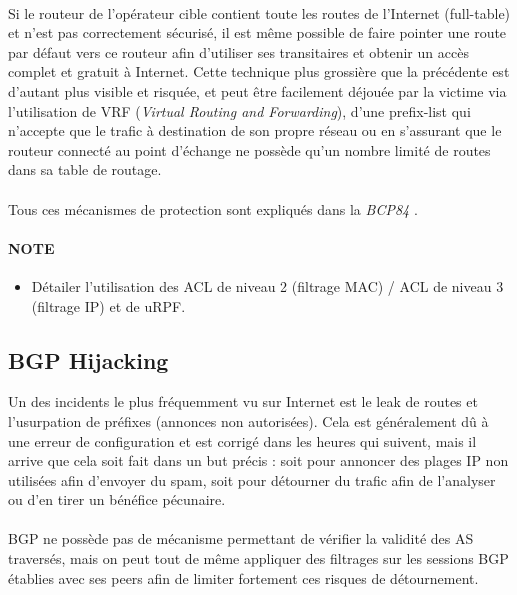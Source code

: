 \paragraph{}
Si le routeur de l'opérateur cible contient toute les routes de l'Internet (full-table) et n'est pas correctement sécurisé, il est même possible de faire pointer une route par défaut vers ce routeur afin d’utiliser ses transitaires et obtenir un accès complet et gratuit à Internet. Cette technique plus grossière que la précédente est d'autant plus visible et risquée, et peut être facilement déjouée par la victime via l'utilisation de VRF (\emph{Virtual Routing and Forwarding}), d'une prefix-list qui n'accepte que le trafic à destination de son propre réseau ou en s'assurant que le routeur connecté au point d'échange ne possède qu'un nombre limité de routes dans sa table de routage.

\paragraph{}
Tous ces mécanismes de protection sont expliqués dans la \emph{BCP84} \cite{fenioux:BCP84}.


\paragraph{NOTE}
\begin{itemize}
\item Détailer l'utilisation des ACL de niveau 2 (filtrage MAC) / ACL de niveau 3 (filtrage IP) et de uRPF.
\end{itemize}


\subsection{BGP Hijacking}

Un des incidents le plus fréquemment vu sur Internet est le leak de routes et l'usurpation de préfixes (annonces non autorisées). Cela est généralement dû à une erreur de configuration et est corrigé dans les heures qui suivent, mais il arrive que cela soit fait dans un but précis : soit pour annoncer des plages IP non utilisées afin d'envoyer du spam, soit pour détourner du trafic afin de l'analyser ou d'en tirer un bénéfice pécunaire.

\paragraph{}
BGP ne possède pas de mécanisme permettant de vérifier la validité des AS traversés, mais on peut tout de même appliquer des filtrages sur les sessions BGP établies avec ses peers afin de limiter fortement ces risques de détournement.

